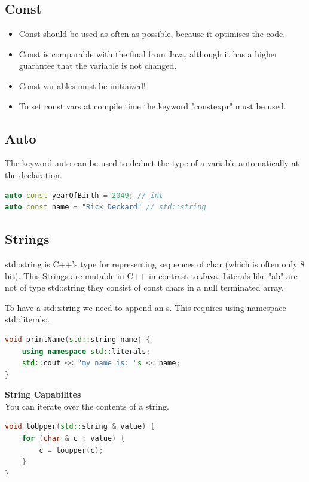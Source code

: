 \subsection{Const}
\begin{itemize}
  \itemsep -0.5em 
  \item Const should be used as often as possible, because it optimises the code.
  \item Const is comparable with the final from Java, although it has a higher guarantee that the variable is not changed.
  \item Const variables must be initiaized!
  \item To set const vars at compile time the keyword "constexpr" must be used.
\end{itemize}

\subsection{Auto}
The keyword auto can be used to deduct the type of a variable automatically at the declaration.
\begin{lstlisting}[language=C++]
auto const yearOfBirth = 2049; // int
auto const name = "Rick Deckard" // std::string
\end{lstlisting}

\subsection{Strings}
 std::string is C++'s type for representing sequences of char (which is often only 8 bit). This Strings are mutable in C++ in contrast to Java. Literals like "ab" are not of type std::string they consist of const chars in a null terminated array.
 
 To have a std::string we need to append an s. This requires using namespace std::literals;.
 
 \begin{lstlisting}[language=C++]
 void printName(std::string name) {
	using namespace std::literals;
	std::cout << "my name is: "s << name;
}	
\end{lstlisting}

\textbf{String Capabilites}\\
 You can iterate over the contents of a string.
\begin{lstlisting}[language=C++]
void toUpper(std::string & value) {
	for (char & c : value) {
		c = toupper(c); 
	}
}	
\end{lstlisting}
\pagebreak


